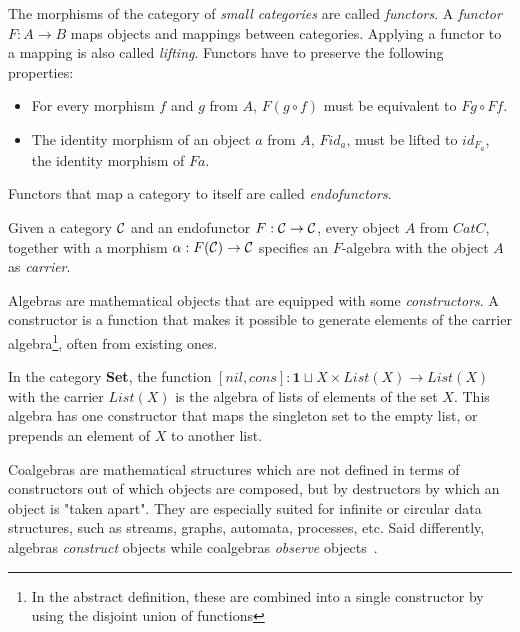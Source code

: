 \begin{definition}
    The morphisms of the category of \textit{small categories} are called \textit{functors}.
    A \textit{functor} $F : A \rightarrow B$ maps objects and mappings between categories.
    Applying a functor to a mapping is also called \textit{lifting}.
    Functors have to preserve the following properties:

    \begin{itemize}
        \item For every morphism $f$ and $g$ from $A$, $F (g \circ f)$
              must be equivalent to $F g \circ F f$.
        \item The identity morphism of an object $a$ from $A$, $F id_a $,
              must be lifted to $id_{F_a}$, the identity morphism of $F a$.
    \end{itemize}

    Functors that map a category to itself are called \textit{endofunctors}.
\end{definition}

\begin{definition}
    Given a category $\mathcal{C}$ and an endofunctor $F : \mathcal{C} \rightarrow \mathcal{C}$,
    every object $A$ from $Cat{C}$, together with a morphism
    $\alpha : F(\mathcal{C}) \rightarrow \mathcal{C}$
    specifies an $F$-algebra with the object $A$ as \textit{carrier}.
\end{definition}

Algebras are mathematical objects that are equipped with some \textit{constructors}.
A constructor is a function that makes it possible to generate elements of
the carrier algebra\footnote{In the abstract definition, these are combined into a single
constructor by using the disjoint union of functions}, often from existing ones.

\begin{example}
    In the category \textbf{Set}, the function
    $[\textit{nil}, \textit{cons}] : \textbf{1} \sqcup X \times List(X) \rightarrow List(X)$
    with the carrier $List(X)$ is the algebra of lists of elements of the set $X$.
    This algebra has one constructor that maps the singleton set to the empty list,
    or prepends an element of $X$ to another list.
\end{example}

Coalgebras are mathematical structures which are not defined in terms of constructors
out of which objects are composed, but by destructors by which an object is "taken apart".
They are especially suited for infinite or circular data structures,
such as streams, graphs, automata, processes, etc.
Said differently, algebras \textit{construct} objects
while coalgebras \textit{observe} objects~\cite{Jacobs97atutorial}.

